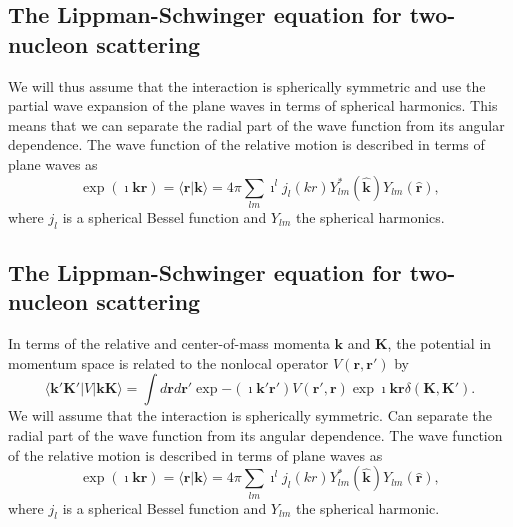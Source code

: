 \documentclass[%
twoside,                 %
final,                   %
10pt]{article}
\begin{document}
\subsection{The Lippman-Schwinger equation for two-nucleon scattering}
\begin{block}{}
We will thus assume that the interaction is spherically symmetric and use
the partial wave expansion of the plane waves in
terms of spherical harmonics.
This means that we can separate the radial part of the wave function from its
angular dependence. The wave function of the relative motion is described
in terms of plane waves as
\[
\exp{(\imath \mathbf{kr})}=\langle\mathbf{r}\vert\mathbf{k}\rangle=4\pi\sum_{lm}\imath^{l}j_{l}(kr)Y_{lm}^{*}(\mathbf{\hat{k}})Y_{lm}(\mathbf{\hat{r}}),
\]
where $j_l$ is a spherical Bessel function and $Y_{lm}$ the
spherical harmonics.
\end{block}

\subsection{The Lippman-Schwinger equation for two-nucleon scattering}
\begin{block}{}
In terms of the relative and center-of-mass momenta $\mathbf{k}$ and
$\mathbf{K}$, the potential in momentum space is related to the nonlocal operator
$V(\mathbf{r},\mathbf{r}')$ by
\[
\langle\mathbf{k'K'}\vert V \vert \mathbf{kK}\rangle =\int d\mathbf{r}d \mathbf{r'}
        \exp{-(\imath \mathbf{k'r'})}V(\mathbf{r'},\mathbf{r})\exp{\imath \mathbf{kr}}\delta(\mathbf{K},\mathbf{K'}).
\]
We will assume that the interaction is spherically symmetric.
Can separate the radial part of the wave function from its
angular dependence. The wave function of the relative motion is described
in terms of plane waves as
\[
\exp{(\imath \mathbf{kr})} =\langle\mathbf{r}\vert\mathbf{k}\rangle= 4\pi\sum_{lm}\imath^{l}j_{l}(kr)Y_{lm}^{*}(\mathbf{\hat{k}})Y_{lm}(\mathbf{\hat{r}}),
\]
where $j_l$ is a spherical Bessel function and $Y_{lm}$ the
spherical harmonic.
\end{block}

\end{document}
